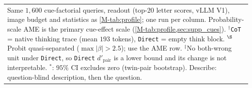 \begin{tabular}{@{}lcc@{}}
\bottomrule
\multicolumn{3}{p{0.95\linewidth}}{\scriptsize Same $1{,}600$ cue-factorial queries, readout (top-20 letter scores, vLLM V1), image budget and statistics as \cref{M-tab:profile}; one run per column. Probability-scale AME is the primary cue-effect scale (\cref{M-tab:profile,sec:supp_cues}). $^\dagger$\texttt{CoT} = native thinking trace (mean $193$ tokens), \texttt{Direct} = empty think block. $^\S$Probit quasi-separated ($\max|\beta|>2.5$); use the AME row. $^\ddagger$No both-wrong unit under \texttt{Direct}, so \texttt{Direct} $d'_\mathrm{pair}$ is a lower bound and its change is not interpretable. $^\ast$: $95\%$ CI excludes zero (twin-pair bootstrap). Describe: question-blind description, then the question.} \\
\end{tabular}
